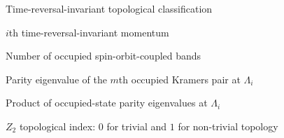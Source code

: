 \begin{thesisfrontmatterentries}
  \item[\(Z_2\)] Time-reversal-invariant topological classification
  \item[\(\Lambda_i\)] \(i\)th time-reversal-invariant momentum
  \item[\(N_{\mathrm{occ}}\)] Number of occupied spin-orbit-coupled bands
  \item[\(\xi_{2m}(\Lambda_i)\)] Parity eigenvalue of the \(m\)th occupied Kramers pair at \(\Lambda_i\)
  \item[\(\delta_i\)] Product of occupied-state parity eigenvalues at \(\Lambda_i\)
  \item[\(\nu\)] \(Z_2\) topological index: \(0\) for trivial and \(1\) for non-trivial topology
\end{thesisfrontmatterentries}

\cleardoublepage
\endgroup
